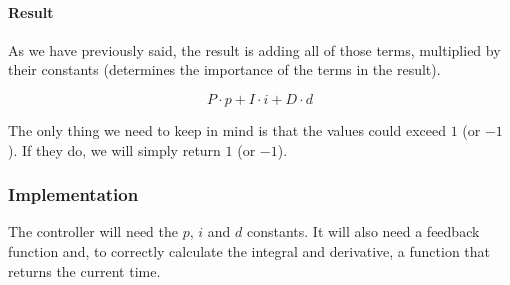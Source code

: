 \documentclass[12pt,twoside]{article}
\let\subsubsubsection\paragraph
\begin{document}
\subsubsubsection{Result}
As we have previously said, the result is adding all of those terms, multiplied by their constants (determines the importance of the terms in the result).

\vspace{-\parskip}\[P \cdot p + I \cdot i + D \cdot d\]

The only thing we need to keep in mind is that the values could exceed $1$ (or $-1$). If they do, we will simply return $1$ (or $-1$).


\subsubsection{Implementation}
The controller will need the $p$, $i$ and $d$ constants. It will also need a feedback function and, to correctly calculate the integral and derivative, a function that returns the current time.
\end{document}
